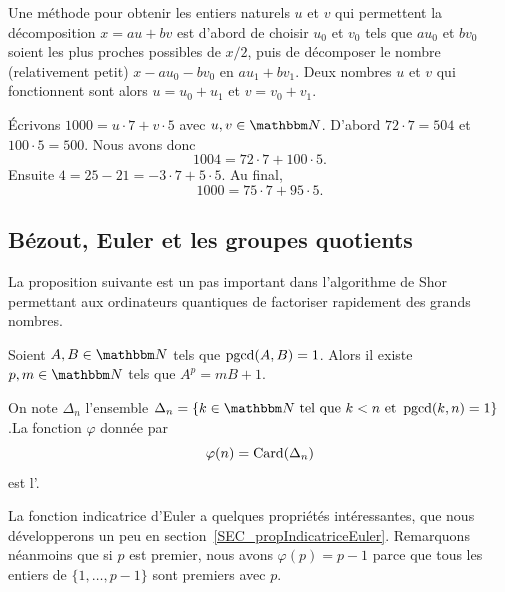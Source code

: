 \begin{normaltext}
    Une méthode pour obtenir les entiers naturels $u$ et $v$ qui permettent la décomposition \(x = au + bv \) est d'abord de choisir $u_0$ et $v_0$ tels que \( au_0 \) et \( bv_0 \) soient les plus proches possibles de $x/2$, puis de décomposer le nombre (relativement petit) \( x - au_0 - bv_0 \) en \( au_1 + bv_1 \). Deux nombres $u$ et $v$ qui fonctionnent sont alors $u = u_0 + u_1$ et $v = v_0 + v_1$.
\end{normaltext}

\begin{example}
    Écrivons \( 1000=u\cdot 7+v\cdot 5\) avec \( u,v\in \eN\). D'abord \( 72\cdot 7=504\) et \( 100\cdot 5=500\). Nous avons donc
    \begin{equation}
        1004=72\cdot 7+100\cdot 5.
    \end{equation}
    Ensuite \( 4=25-21=-3\cdot 7+5\cdot 5\). Au final,
    \begin{equation}
        1000=75\cdot 7+95\cdot 5.
    \end{equation}
\end{example}


\subsection{Bézout, Euler et les groupes quotients}

La proposition suivante est un pas important dans l'algorithme de Shor permettant aux ordinateurs quantiques de factoriser rapidement des grands nombres.

\begin{proposition}       \label{PROPooZCKXooOtocKE}
    Soient \( A,B\in \eN\) tels que \( \operatorname{pgcd}(A,B)=1\). Alors il existe \( p,m\in \eN\) tels que \( A^p=mB+1\).
\end{proposition}

\begin{definition}      \label{DEFooWYIGooRVBTil}
    On note \( \Delta_n \) l'ensemble \( \Delta_n = \{ k \in \eN \tq k < n \text{ et } \pgcd(k,n)=1\} \).La fonction \( \varphi\) donnée par
\begin{equation}    \label{EqEulerGqPsvi}
    \varphi(n)=\operatorname{Card}( \Delta_n )
\end{equation}
est l'.
\end{definition}
La fonction indicatrice d'Euler a quelques propriétés intéressantes, que nous développerons un peu en section~\ref{SEC_propIndicatriceEuler}. Remarquons néanmoins que si \( p\) est premier, nous avons \( \varphi(p)=p-1\) parce que tous les entiers de \( \{ 1,\ldots, p-1 \}\) sont premiers avec \( p\).

